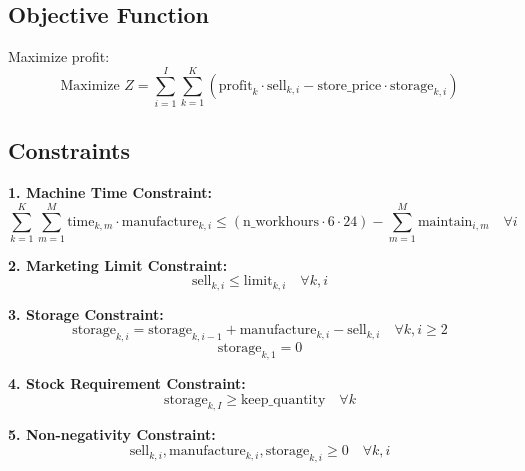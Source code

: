 \documentclass{article}
\begin{document}
\subsection*{Objective Function}
Maximize profit:
\[
\text{Maximize } Z = \sum_{i=1}^{I} \sum_{k=1}^{K} \left( \text{profit}_{k} \cdot \text{sell}_{k, i} - \text{store\_price} \cdot \text{storage}_{k, i} \right)
\]

\subsection*{Constraints}

\textbf{1. Machine Time Constraint:}
\[
\sum_{k=1}^{K} \sum_{m=1}^{M} \text{time}_{k, m} \cdot \text{manufacture}_{k, i} \leq \left( \text{n\_workhours} \cdot 6 \cdot 24 \right) - \sum_{m=1}^{M} \text{maintain}_{i, m} \quad \forall i
\]

\textbf{2. Marketing Limit Constraint:}
\[
\text{sell}_{k, i} \leq \text{limit}_{k, i} \quad \forall k, i
\]

\textbf{3. Storage Constraint:}
\[
\text{storage}_{k, i} = \text{storage}_{k, i-1} + \text{manufacture}_{k, i} - \text{sell}_{k, i} \quad \forall k, i \geq 2
\]
\[
\text{storage}_{k, 1} = 0
\]

\textbf{4. Stock Requirement Constraint:}
\[
\text{storage}_{k, I} \geq \text{keep\_quantity} \quad \forall k
\]

\textbf{5. Non-negativity Constraint:}
\[
\text{sell}_{k, i}, \text{manufacture}_{k, i}, \text{storage}_{k, i} \geq 0 \quad \forall k, i
\]
\end{document}
